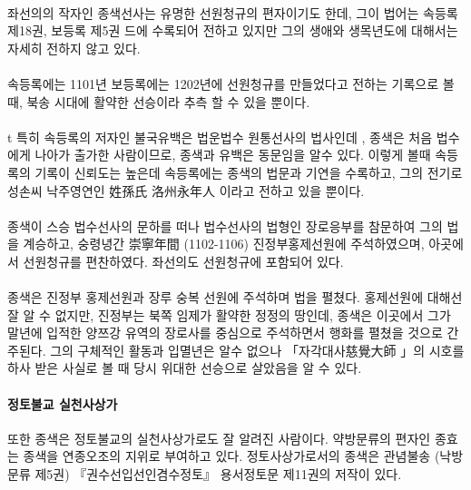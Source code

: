 \documentclass[12pt, a4paper, oneside]{book}
\begin{document}
\paragraph{}
	좌선의의 작자인 종색선사는 유명한 선원청규의 편자이기도 한데, 그이 법어는 속등록 제18권, 보등록 제5권 드에 수록되어 전하고 있지만 그의 생애와 생목년도에 대해서는 자세히 전하지 않고 있다.

\paragraph{}
속등록에는 1101년 보등록에는 1202년에 선원청규를  만들었다고 전하는 기록으로 볼때, 북송 시대에 활약한 선승이라 추측 할 수 있을 뿐이다.


\paragraph{}t
특히 속등록의 저자인 불국유백은 법운법수 원통선사의 법사인데 , 종색은 처음 법수에게 나아가 출가한 사람이므로, 종색과 유백은 동문임을 알수 있다.
이렇게 볼때 속등록의 기록이 신뢰도는 높은데 속등록에는 종색의 법문과 기연을 수록하고, 그의 전기로 성손씨 낙주영연인 姓孫氏 洛州永年人 이라고 전하고 있을 뿐이다.

\paragraph{}
종색이 스승 법수선사의 문하를 떠나 법수선사의 법형인 장로응부를 참문하여 그의 법을 계승하고, 숭령녕간 崇寧年間 (1102-1106) 진정부홍제선원에 주석하였으며, 아곳에서 선원청규를  편찬하였다. 좌선의도 선원청규에 포함되어 있다.


\paragraph{}

종색은 진정부 홍제선원과 장루 숭복 선원에 주석하며 법을 펼쳤다.
홍제선원에 대해선 잘 알 수 없지만, 진정부는 북쪽 임제가 활약한 정정의 땅인데, 종색은 이곳에서 그가 말년에 입적한 양쯔강 유역의 장로사를 중심으로 주석하면서 행화를 펼쳤을 것으로 간주된다.
그의 구체적인 활동과 입멸년은 알수 없으나 「자각대사慈覺大師 」의 시호를 하사 받은 사실로 볼 때 당시 위대한 선승으로 살았음을 알 수 있다.

\paragraph{ 정토불교 실천사상가 }
또한 종색은 정토불교의 실천사상가로도 잘 알려진 사람이다. 
약방문류의 편자인 종효는 종색을 연종오조의 지위로 부여하고 있다.
정토사상가로서의 종색은 관념불송 (낙방문류 제5권) 『권수선입선인겸수정토』 용서정토문 제11권의 저작이 있다.
\end{document}
